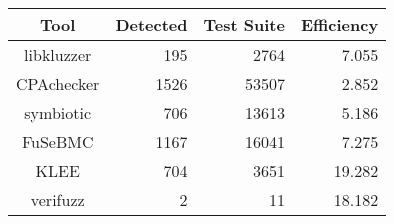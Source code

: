 \begin{table}
	\begin{center}
		\begin{tabular}{|c|r|r|r|}
			\hline
			Tool & Detected & Test Suite & Efficiency \\
			\hline
			libkluzzer & 195 & 2764 & 7.055 \\
			\hline
			CPAchecker & 1526 & 53507 & 2.852 \\
			\hline
			symbiotic & 706 & 13613 & 5.186 \\
			\hline
			FuSeBMC & 1167 & 16041 & 7.275 \\
			\hline
			KLEE & 704 & 3651 & 19.282 \\
			\hline
			verifuzz & 2 & 11 & 18.182 \\
			\hline
		\end{tabular}
	\end{center}
\end{table}